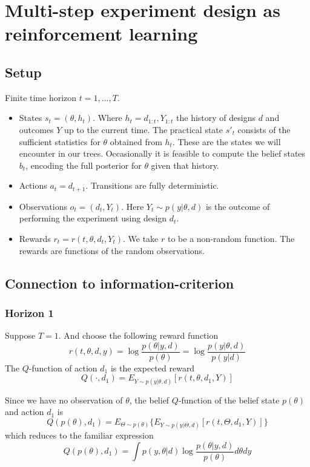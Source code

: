 \section{Multi-step experiment design as reinforcement learning}
\label{sec:oedasrl}
\subsection{Setup}
Finite time horizon $t=1, ..., T$.
\begin{itemize}
\item States $s_t = (\theta, h_t)$. Where $h_t = d_{1:t}, Y_{1:t}$ the history of designs $d$ and outcomes $Y$ up to the current time. The practical state $s'_t$ consists of the sufficient statistics for $\theta$ obtained from $h_t$. These are the states we will encounter in our trees. Occasionally it is feasible to compute the belief states $b_t$, encoding the full posterior for $\theta$ given that history.
\item Actions $a_t = d_{t+1}$. Transitions are fully deterministic.
\item Observations $o_t = (d_t, Y_t)$. Here $Y_t \sim p(y | \theta, d)$ is the outcome of performing the experiment using design $d_t$.
\item Rewards $r_t = r(t, \theta, d_t, Y_t)$. We take $r$ to be a non-random function. The rewards are functions of the random observations.
\end{itemize}

\subsection{Connection to information-criterion}
\subsubsection{Horizon 1}
Suppose $T=1$. And choose the following reward function
\begin{equation}
r(t, \theta, d, y) = \log \frac{p(\theta | y, d)}{p(\theta)} = \log \frac{p(y | \theta, d)}{p(y|d)}
\end{equation}
The $Q$-function of action $d_1$ is the expected reward
\begin{equation}
	Q(\cdot, d_1) = E_{Y \sim p(y|\theta, d)}[r(t, \theta, d_1, Y)]
\end{equation}

Since we have no observation of $\theta$, the belief $Q$-function of the belief state $p(\theta)$ and action $d_1$ is
\begin{equation}
	Q(p(\theta), d_1) = E_{\Theta \sim p(\theta)}\{E_{Y \sim p(y|\Theta, d)}[r(t, \Theta, d_1, Y)]\}
\end{equation}
which reduces to the familiar expression
\begin{equation}
	Q(p(\theta), d_1) = \int p(y, \theta | d) \log \frac{p(\theta | y, d)}{p(\theta)} d\theta dy
\end{equation}

